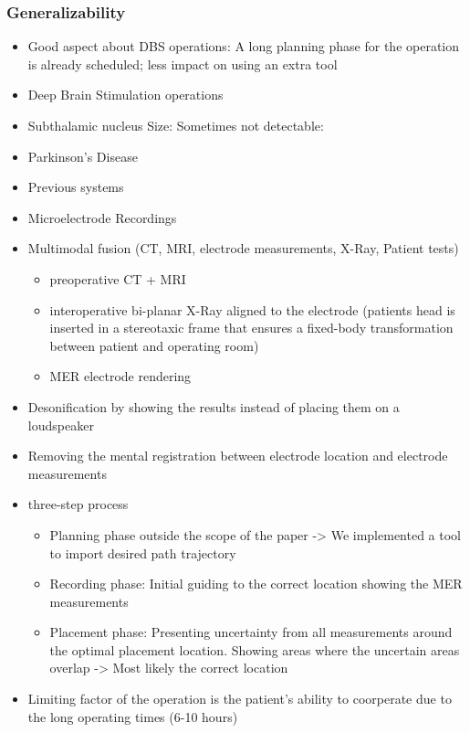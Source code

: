 \subsubsection{Generalizability}
\label{contributions:medbio:dbs:generalizability}


\begin{itemize}
\item Good aspect about DBS operations: A long planning phase for the operation is already scheduled; less impact on using an extra tool
\item Deep Brain Stimulation operations  \cite{Benabid2009} \cite{Lindberg2002}
\item Subthalamic nucleus Size: \cite{Richter2004} Sometimes not detectable: \cite{Starr2002}
\item Parkinson's Disease
\item Previous systems
\item Microelectrode Recordings \cite{Lenz1988}
\item Multimodal fusion (CT, MRI, electrode measurements, X-Ray, Patient tests)
\begin{itemize}
    \item preoperative CT + MRI
    \item interoperative bi-planar X-Ray aligned to the electrode (patients head is inserted in a stereotaxic frame that ensures a fixed-body transformation between patient and operating room)
    \item MER electrode rendering
\end{itemize}
\item Desonification by showing the results instead of placing them on a loudspeaker
\item Removing the mental registration between electrode location and electrode measurements
\item three-step process
\begin{itemize}
    \item Planning phase outside the scope of the paper -> We implemented a tool to import desired path trajectory \cite{Shamir2010}
    \item Recording phase: Initial guiding to the correct location showing the MER measurements
    \item Placement phase: Presenting uncertainty from all measurements around the optimal placement location. Showing areas where the uncertain areas overlap -> Most likely the correct location
\end{itemize}
\item Limiting factor of the operation is the patient's ability to coorperate due to the long operating times (6-10 hours)

\end{itemize}
